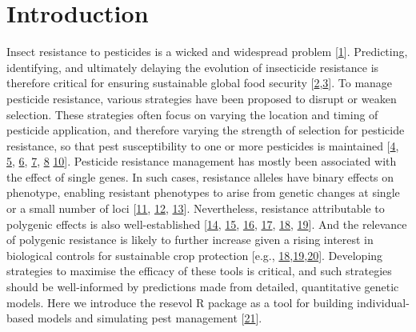 \documentclass[10pt,letterpaper]{article}
\begin{document}
\section*{Introduction}
Insect resistance to pesticides is a wicked and widespread problem {[}\protect\hyperlink{ref-Gould2018}{1}{]}.
Predicting, identifying, and ultimately delaying the evolution of insecticide resistance is therefore critical for ensuring sustainable global food security {[}\protect\hyperlink{ref-Hawkins2019}{2},\protect\hyperlink{ref-Lykogianni2021}{3}{]}.
To manage pesticide resistance, various strategies have been proposed to disrupt or weaken selection.
These strategies often focus on varying the location and timing of pesticide application, and therefore varying the strength of selection for pesticide resistance, so that pest susceptibility to one or more pesticides is maintained {[}\protect\hyperlink{ref-Ives2002}{4}, \protect\hyperlink{ref-Liang2013}{5}, \protect\hyperlink{ref-Carriere2016}{6}, \protect\hyperlink{ref-Liang2018}{7}, \protect\hyperlink{ref-South2018}{8}  \protect\hyperlink{ref-Saikai2021}{10}{]}.
Pesticide resistance management has mostly been associated with the effect of single genes.
In such cases, resistance alleles have binary effects on phenotype, enabling resistant phenotypes to arise from genetic changes at single or a small number of loci {[}\protect\hyperlink{ref-Raymond2001}{11}, \protect\hyperlink{ref-Ffrench-Constant2004}{12}, \protect\hyperlink{ref-Ffrench-Constant2013}{13}{]}.
Nevertheless, resistance attributable to polygenic effects is also well-established {[}\protect\hyperlink{ref-Via1986}{14}, \protect\hyperlink{ref-Firko1990}{15}, \protect\hyperlink{ref-Busi2013}{16}, \protect\hyperlink{ref-Haridas2018}{17}, \protect\hyperlink{ref-Green2020}{18}, \protect\hyperlink{ref-Mangan2023}{19}{]}.
And the relevance of polygenic resistance is likely to further increase given a rising interest in biological controls for sustainable crop protection {[}e.g., \protect\hyperlink{ref-Green2020}{18},\protect\hyperlink{ref-Mangan2023}{19},\protect\hyperlink{ref-Elnahal2022}{20}{]}.
Developing strategies to maximise the efficacy of these tools is critical, and such strategies should be well-informed by predictions made from detailed, quantitative genetic models.
Here we introduce the resevol R package as a tool for building individual-based models and simulating pest management {[}\protect\hyperlink{ref-Daly2022}{21}{]}.
\end{document}
